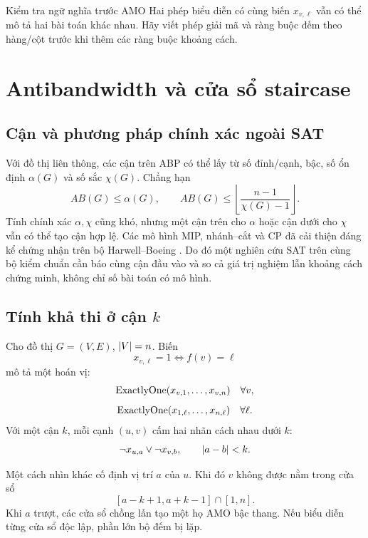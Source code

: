 \begin{designrule}{Kiểm tra ngữ nghĩa trước AMO}
Hai phép biểu diễn có cùng biến \(x_{v,\ell}\) vẫn có thể mô tả hai bài toán khác
nhau. Hãy viết phép giải mã và ràng buộc đếm theo hàng/cột trước khi thêm các
ràng buộc khoảng cách.
\end{designrule}

\section{Antibandwidth và cửa sổ staircase}

\subsection{Cận và phương pháp chính xác ngoài SAT}

Với đồ thị liên thông, các cận trên ABP có thể lấy từ số đỉnh/cạnh, bậc, số ổn
định \(\alpha(G)\) và số sắc \(\chi(G)\). Chẳng hạn
\[
  AB(G)\le \alpha(G),
  \qquad
  AB(G)\le
  \left\lfloor\frac{n-1}{\chi(G)-1}\right\rfloor.
\]
Tính chính xác \(\alpha,\chi\) cũng khó, nhưng một cận trên cho
\(\alpha\) hoặc cận dưới cho \(\chi\) vẫn có thể tạo cận hợp lệ. Các mô hình
MIP, nhánh--cắt và CP đã cải thiện đáng kể chứng nhận trên bộ Harwell--Boeing
\parencite{sinnl2021antibandwidth}. Do đó một nghiên cứu SAT trên cùng bộ kiểm
chuẩn cần báo cùng cận đầu vào và so cả giá trị nghiệm lẫn khoảng cách chứng
minh, không chỉ số bài toán có mô hình.

\subsection[Tính khả thi ở cận k]{Tính khả thi ở cận \(k\)}

Cho đồ thị \(G=(V,E)\), \(\lvert V\rvert=n\). Biến
\[
  x_{v,\ell}=1\iff f(v)=\ell
\]
mô tả một hoán vị:
\[
  \operatorname{ExactlyOne}(x_{v,1},\ldots,x_{v,n})
  \quad\forall v,
\]
\[
  \operatorname{ExactlyOne}(x_{1,\ell},\ldots,x_{n,\ell})
  \quad\forall\ell.
\]
Với một cận \(k\), mỗi cạnh \((u,v)\) cấm hai nhãn cách nhau dưới \(k\):
\[
  \neg x_{u,a}\lor\neg x_{v,b},
  \qquad \lvert a-b\rvert<k.
\]

Một cách nhìn khác cố định vị trí \(a\) của \(u\). Khi đó \(v\) không được
nằm trong cửa sổ
\[
  [a-k+1,a+k-1]\cap[1,n].
\]
Khi \(a\) trượt, các cửa sổ chồng lấn tạo một họ AMO bậc thang. Nếu biểu diễn
từng cửa sổ độc lập, phần lớn bộ đếm bị lặp.


